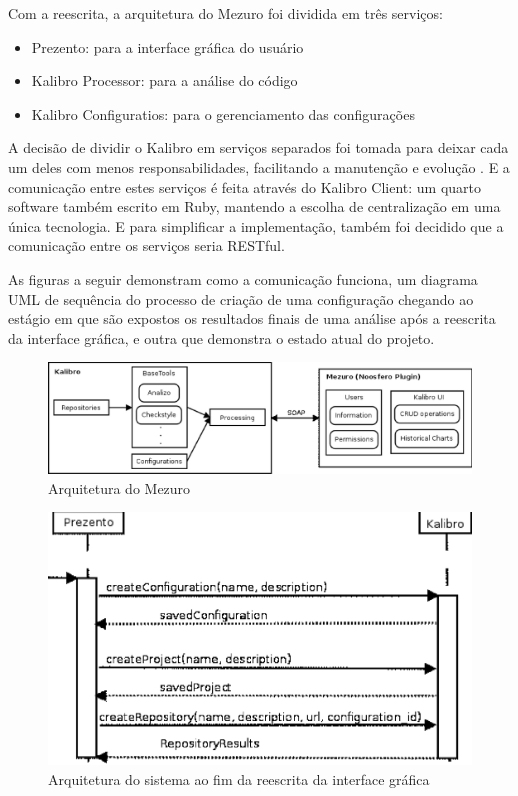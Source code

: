 Com a reescrita, a arquitetura do Mezuro foi dividida em três serviços:

\begin{itemize}
  \item Prezento: para a interface gráfica do usuário
  \item Kalibro Processor: para a análise do código
  \item Kalibro Configuratios: para o gerenciamento das configurações
\end{itemize}

A decisão de dividir o Kalibro em serviços separados foi tomada para deixar
cada um deles com menos responsabilidades, facilitando a manutenção e evolução
\cite{camarinhaOSS2015}. E a comunicação entre estes serviços é feita através
do Kalibro Client: um quarto software também escrito em Ruby, mantendo a
escolha de centralização em uma única tecnologia. E para simplificar a
implementação, também foi decidido que a comunicação entre os serviços seria
RESTful.

As figuras a seguir demonstram como a comunicação funciona, um diagrama UML de
sequência do processo de criação de uma configuração chegando ao estágio em que
são expostos os resultados finais de uma análise após a reescrita da interface
gráfica, e outra que demonstra o estado atual do projeto.


\begin{figure}[!htb]
	\centering
	\label{mezuroNoosferoArch}
		\includegraphics[keepaspectratio=true,scale=0.5]{figuras/mezuroNoosferoArch.eps}
	\caption{Arquitetura do Mezuro \cite{camarinhaOSS2015}}
\end{figure}

\begin{figure}[h]
	\centering
	\label{prevProcessingSeqDiag}
		\includegraphics[keepaspectratio=true,scale=0.7]{figuras/prevProcessingSeqDiag.eps}
	\caption{Arquitetura do sistema ao fim da reescrita da interface gráfica \cite{meirellesCibse2015}}
\end{figure}

